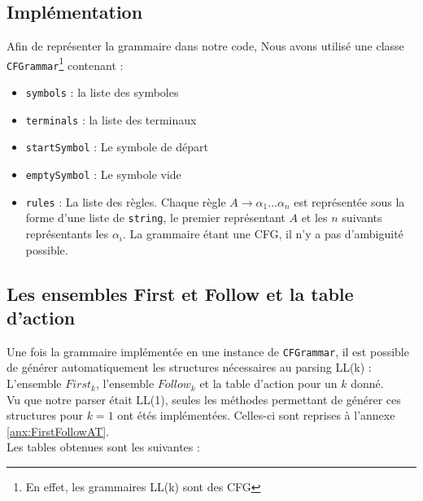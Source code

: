 \documentclass[a4paper,10pt]{article}
\begin{document}
\subsection{Implémentation}

Afin de représenter la grammaire dans notre code, Nous avons utilisé une classe \verb?CFGrammar?\footnote{En effet, les grammaires LL(k) sont des CFG} contenant :
\begin{itemize}

\item \verb?symbols? : la liste des symboles
\item \verb?terminals? : la liste des terminaux
\item \verb?startSymbol? : Le symbole de départ
\item \verb?emptySymbol? : Le symbole vide
\item \verb?rules? : La liste des règles. Chaque règle $A \rightarrow \alpha_1 ... \alpha_n$ est représentée sous la forme d'une liste de \verb?string?, le premier représentant $A$ et les $n$ suivants représentants les $\alpha_i$. La grammaire étant une CFG, il n'y a pas d'ambiguité possible.

\end{itemize}

\subsection{Les ensembles First et Follow et la table d'action}

Une fois la grammaire implémentée en une instance de \verb?CFGrammar?, il est possible de générer automatiquement les structures nécessaires au parsing LL(k) : L'ensemble $First_k$, l'ensemble $Follow_k$ et la table d'action pour un $k$ donné.\\

Vu que notre parser était LL(1), seules les méthodes permettant de générer ces structures pour $k = 1$ ont étés implémentées. Celles-ci sont reprises à l'annexe \ref{anx:FirstFollowAT}.\\

Les tables obtenues sont les suivantes : 
\end{document}
